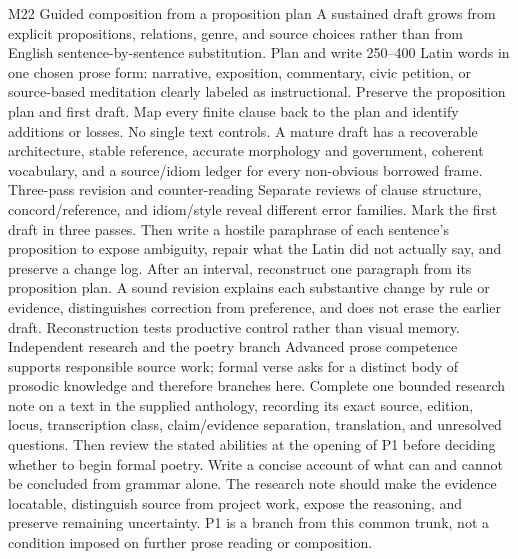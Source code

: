 \begin{courseunit}{M22}
\SubmoduleExtension
  {Guided composition from a proposition plan}
  {A sustained draft grows from explicit propositions, relations, genre, and
  source choices rather than from English sentence-by-sentence substitution.}
  {Plan and write 250--400 Latin words in one chosen prose form: narrative,
  exposition, commentary, civic petition, or source-based meditation clearly
  labeled as instructional.  Preserve the proposition plan and first draft.}
  {Map every finite clause back to the plan and identify additions or losses.}
  {No single text controls.  A mature draft has a recoverable architecture,
  stable reference, accurate morphology and government, coherent vocabulary,
  and a source/idiom ledger for every non-obvious borrowed frame.}
\SubmoduleExtension
  {Three-pass revision and counter-reading}
  {Separate reviews of clause structure, concord/reference, and idiom/style
  reveal different error families.}
  {Mark the first draft in three passes.  Then write a hostile paraphrase of
  each sentence's proposition to expose ambiguity, repair what the Latin did
  not actually say, and preserve a change log.}
  {After an interval, reconstruct one paragraph from its proposition plan.}
  {A sound revision explains each substantive change by rule or evidence,
  distinguishes correction from preference, and does not erase the earlier
  draft.  Reconstruction tests productive control rather than visual memory.}
\SubmoduleExtension
  {Independent research and the poetry branch}
  {Advanced prose competence supports responsible source work; formal verse
  asks for a distinct body of prosodic knowledge and therefore branches here.}
  {Complete one bounded research note on a text in the supplied anthology,
  recording its exact source, edition, locus, transcription class,
  claim/evidence separation, translation, and unresolved questions.  Then
  review the stated abilities at the opening of P1 before deciding whether to
  begin formal poetry.}
  {Write a concise account of what can and cannot be concluded from grammar
  alone.}
  {The research note should make the evidence locatable, distinguish source
  from project work, expose the reasoning, and preserve remaining uncertainty.
  P1 is a branch from this common trunk, not a
  condition imposed on further prose reading or composition.}
\end{courseunit}
